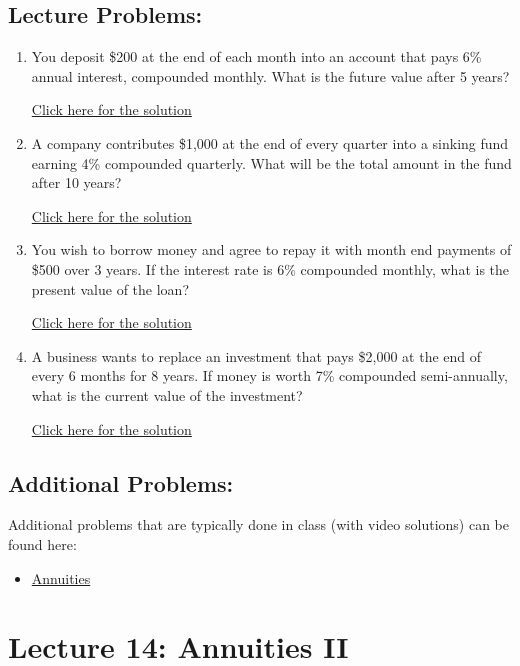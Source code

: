 \documentclass[
]{book}
\providecommand{\tightlist}{%
  \setlength{\itemsep}{0pt}\setlength{\parskip}{0pt}}
\begin{document}
\subsection*{Lecture Problems:}\label{lecture-problems-12}

\begin{enumerate}
\def\labelenumi{\arabic{enumi}.}
\tightlist
\item
  You deposit \$200 at the end of each month into an account that pays 6\% annual interest, compounded monthly. What is the future value after 5 years?

  \href{https://youtu.be/OAXT2ToWdBA}{Click here for the solution}
\item
  A company contributes \$1,000 at the end of every quarter into a sinking fund earning 4\% compounded quarterly. What will be the total amount in the fund after 10 years?

  \href{https://youtu.be/VBQIpujkc1M}{Click here for the solution}
\item
  You wish to borrow money and agree to repay it with month end payments of \$500 over 3 years. If the interest rate is 6\% compounded monthly, what is the present value of the loan?

  \href{https://youtu.be/0wgCXQdIBXo}{Click here for the solution}
\item
  A business wants to replace an investment that pays \$2,000 at the end of every 6 months for 8 years. If money is worth 7\% compounded semi-annually, what is the current value of the investment?

  \href{https://youtu.be/cceWAK1oBOQ}{Click here for the solution}
\end{enumerate}

\subsection*{Additional Problems:}\label{additional-problems-12}

Additional problems that are typically done in class (with video solutions) can be found here:

\begin{itemize}
\tightlist
\item
  \href{https://theelementsmath.github.io/M114/annuity-basics.html\#annuities}{Annuities}
\end{itemize}

\section*{Lecture 14: Annuities II}\label{lecture-14-annuities-ii}
\end{document}
